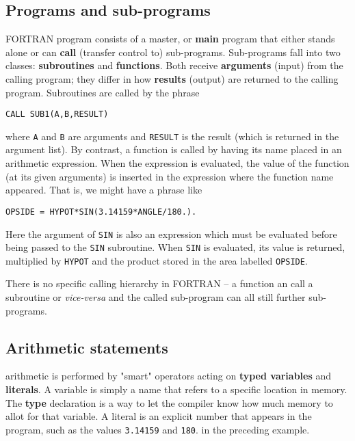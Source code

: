 \subsection{Programs and sub-programs} 
 FORTRAN program consists of a master, or \textbf{main} program that either stands alone or can \textbf{call} (transfer control to) sub-programs. Sub-programs fall into two classes: \textbf{subroutines} and \textbf{functions}. Both receive \textbf{arguments} (input) from the calling program; they differ in how \textbf{results} (output) are returned to the calling program. Subroutines are called by the phrase

\begin{verbatim}
CALL SUB1(A,B,RESULT)
\end{verbatim}

where \verb|A| and \verb|B| are arguments and \verb|RESULT| is the result (which is returned in the argument list). By contrast, a function is called by having its name placed in an arithmetic expression. When the expression is evaluated, the value of the function (at its given arguments) is inserted in the expression where the function name appeared. That is, we might have a phrase like

\begin{verbatim}
OPSIDE = HYPOT*SIN(3.14159*ANGLE/180.).
\end{verbatim}

Here the argument of \verb|SIN| is also an expression which must be evaluated before being passed to the \verb|SIN| subroutine. When \verb|SIN| is evaluated, its value is returned, multiplied by \verb|HYPOT| and the product stored in the area labelled \verb|OPSIDE|.

There is no specific calling hierarchy in FORTRAN -- a function an call a subroutine or \textit{vice-versa} and the called sub-program can all still further sub-programs.

\subsection{Arithmetic statements}
 arithmetic is performed by "smart" operators acting on \textbf{typed variables} and \textbf{literals}. A variable is simply a name that refers to a specific location in memory. The \textbf{type} declaration is a way to let the compiler know how much memory to allot for that variable. A literal is an explicit number that appears in the program, such as the values \verb|3.14159| and \verb|180|. in the preceding example.

